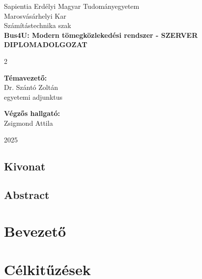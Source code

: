 \documentclass[a4paper, 12pt, twoside]{report}
\begin{document}
\begin{titlepage}
  \centering
  \Large
  Sapientia Erdélyi Magyar Tudományegyetem \\
  Marosvásárhelyi Kar \\
  Számítástechnika szak \\
  \vspace{1.5in}
  \Huge
  \textbf{Bus4U: Modern tömegközlekedési rendszer - SZERVER} \\
  \vspace{0.5in}
  \Huge
  \textbf{DIPLOMADOLGOZAT} \\
  \vspace{1in}
  \Large
  \begin{multicols}{2}
    \begin{flushleft}
      \textbf{Témavezető:} \\
      Dr. Szántó Zoltán \\ egyetemi adjunktus
    \end{flushleft}
    \columnbreak
    \begin{flushright}
      \textbf{Végzős hallgató:} \\
      Zsigmond Attila
    \end{flushright}
  \end{multicols}
  \vspace{0.5in}
  \LARGE
  2025
\end{titlepage}

\renewcommand{\abstractname}{Kivonat}
\section*{\abstractname}


\renewcommand{\abstractname}{Abstract}
\section*{\abstractname}


\clearpage
\pagestyle{plain}

\tableofcontents
\listoffigures

\chapter{Bevezető}


\chapter{Célkitűzések}

\end{document}
